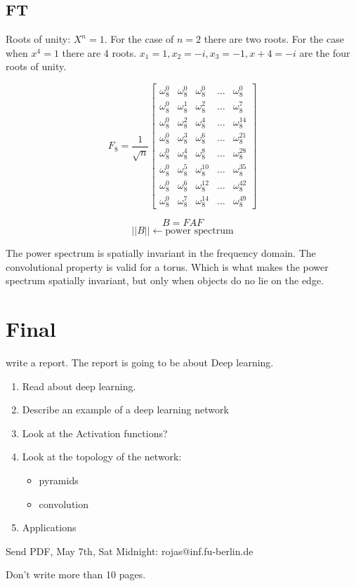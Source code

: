 \documentclass[letterpaper, 9pt]{article}
\begin{document}
\subsection{FT}
Roots of unity: $X^n = 1$. For the case of $n=2$ there are two roots. For the case when $x^4=1$ there are 4 roots. $x_1=1,x_2=-i,x_3=-1,x+4=-i$ are the four roots of unity.

\begin{equation}
F_8 = \frac{1}{\sqrt{n}}
\begin{bmatrix}
\omega_8^0 & \omega_8^0 & \omega_8^0 & \dots & \omega_8^0 \\
\omega_8^0 & \omega_8^1 & \omega_8^2 & \dots & \omega_8^7 \\
\omega_8^0 & \omega_8^2 & \omega_8^4 & \dots & \omega_8^14 \\
\omega_8^0 & \omega_8^3 & \omega_8^6 & \dots & \omega_8^21 \\
\omega_8^0 & \omega_8^4 & \omega_8^8 & \dots & \omega_8^28 \\
\omega_8^0 & \omega_8^5 & \omega_8^10 & \dots & \omega_8^35 \\
\omega_8^0 & \omega_8^6 & \omega_8^12 & \dots & \omega_8^42 \\
\omega_8^0 & \omega_8^7 & \omega_8^14 & \dots & \omega_8^49
\end{bmatrix}
\end{equation}

\begin{equation}
B = FAF
\end{equation}
\begin{equation}
||B|| \leftarrow \text{power spectrum}
\end{equation}

The power spectrum is spatially invariant in the frequency domain. The convolutional property is valid for a torus. Which is what makes the power spectrum spatially invariant, but only when objects do no lie on the edge.

\section{Final}
write a report. The report is going to be about Deep learning.
\begin{enumerate}
\item Read about deep learning.
\item Describe an example of a deep learning network
\item Look at the Activation functions?
\item Look at the topology of the network:
\begin{itemize}
\item pyramids
\item convolution
\end{itemize}
\item Applications
\end{enumerate}

Send PDF, May 7th, Sat Midnight: rojas@inf.fu-berlin.de

Don't write more than 10 pages.
\end{document}
